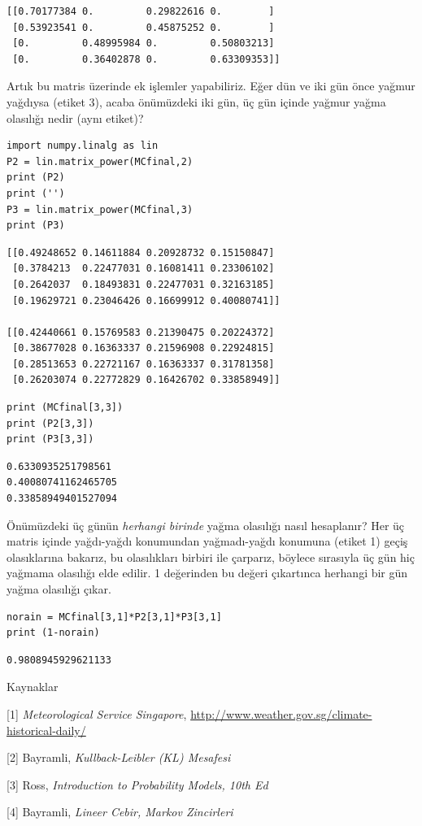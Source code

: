 \documentclass[12pt,fleqn]{article}\usepackage{../../common}
\begin{document}
\begin{verbatim}
[[0.70177384 0.         0.29822616 0.        ]
 [0.53923541 0.         0.45875252 0.        ]
 [0.         0.48995984 0.         0.50803213]
 [0.         0.36402878 0.         0.63309353]]
\end{verbatim}

Artık bu matris üzerinde ek işlemler yapabiliriz. Eğer dün ve iki gün önce
yağmur yağdıysa (etiket 3), acaba önümüzdeki iki gün, üç gün içinde yağmur yağma
olasılığı nedir (aynı etiket)?

\begin{verbatim}
import numpy.linalg as lin
P2 = lin.matrix_power(MCfinal,2)
print (P2)
print ('')
P3 = lin.matrix_power(MCfinal,3)
print (P3)
\end{verbatim}

\begin{verbatim}
[[0.49248652 0.14611884 0.20928732 0.15150847]
 [0.3784213  0.22477031 0.16081411 0.23306102]
 [0.2642037  0.18493831 0.22477031 0.32163185]
 [0.19629721 0.23046426 0.16699912 0.40080741]]

[[0.42440661 0.15769583 0.21390475 0.20224372]
 [0.38677028 0.16363337 0.21596908 0.22924815]
 [0.28513653 0.22721167 0.16363337 0.31781358]
 [0.26203074 0.22772829 0.16426702 0.33858949]]
\end{verbatim}

\begin{verbatim}
print (MCfinal[3,3])
print (P2[3,3])
print (P3[3,3])
\end{verbatim}

\begin{verbatim}
0.6330935251798561
0.40080741162465705
0.33858949401527094
\end{verbatim}

Önümüzdeki üç günün {\em herhangi birinde} yağma olasılığı nasıl hesaplanır?
Her üç matris içinde yağdı-yağdı konumundan yağmadı-yağdı konumuna (etiket 1)
geçiş olasıklarına bakarız, bu olasılıkları birbiri ile çarparız, böylece
sırasıyla üç gün hiç yağmama olasılığı elde edilir. 1 değerinden bu değeri
çıkartınca herhangi bir gün yağma olasılığı çıkar. 

\begin{verbatim}
norain = MCfinal[3,1]*P2[3,1]*P3[3,1]
print (1-norain)
\end{verbatim}

\begin{verbatim}
0.9808945929621133
\end{verbatim}

Kaynaklar

[1] {\em Meteorological Service Singapore},
    \url{http://www.weather.gov.sg/climate-historical-daily/}

[2] Bayramli, {\em Kullback-Leibler (KL) Mesafesi}

[3] Ross, {\em Introduction to Probability Models, 10th Ed}

[4] Bayramli, {\em Lineer Cebir, Markov Zincirleri}
\end{document}
